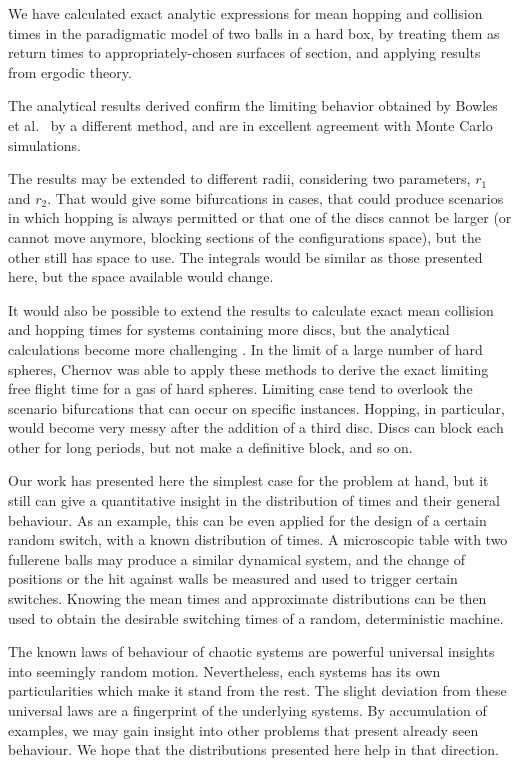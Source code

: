 \documentclass[superscriptaddress,pre,reprint,showpacs,twocolumn]{revtex4-1}
\newcommand{\etal}{et al.\ }
\begin{document}
We have calculated exact analytic expressions for mean hopping and
collision times in the paradigmatic model of two balls in a hard box,
by treating them as return times to  appropriately-chosen surfaces of section, 
and applying results from ergodic theory.

The analytical results derived 
confirm the limiting behavior obtained
by Bowles \etal \cite{Bowles04} by a different method,
and are in excellent agreement with Monte Carlo simulations.

The results may be extended to different radii, considering two parameters,
$r_1$ and $r_2$. That would give some bifurcations in cases, that could
produce scenarios in which hopping is always permitted or that one of the
discs cannot be larger (or cannot move anymore,
blocking sections of the configurations space), but the other still has space to use.
The integrals would be similar as those presented here, but the space available
would change. 

It would also be possible to extend the results to calculate exact mean collision
and hopping times for systems containing more discs,
but the analytical calculations become more challenging \cite{three_hard_discs_2004}.
In the limit of a large number of hard spheres, Chernov \cite{Chernov97}
was able to apply these methods to derive the exact limiting  free flight time for a gas of hard spheres. Limiting case tend to overlook the scenario bifurcations that
can occur on specific instances. Hopping, in particular, would become very
messy after the addition of a third disc. Discs can block each other for long periods,
but not make a definitive block, and so on.

Our work has presented here the simplest case for the problem at hand, but it still
can give a quantitative insight in the distribution of times and their
general behaviour. As an example, this can be even applied for the design of a certain
random switch, with a known distribution of times. A microscopic table with two
fullerene balls may produce a similar dynamical system, and the change of positions
or the hit against walls be measured and used to trigger certain switches. 
Knowing the mean times and approximate distributions can be then used
to obtain the desirable switching times of a random, deterministic machine.

The known laws of behaviour of chaotic systems are powerful universal insights
into seemingly random motion. Nevertheless, each systems has its own
particularities which make it stand from the rest. The slight deviation from
these universal laws are a fingerprint of the underlying systems. By
accumulation of examples, we may gain insight into other problems that
present already seen behaviour. We hope that the distributions presented here
help in that direction. 
\end{document}
